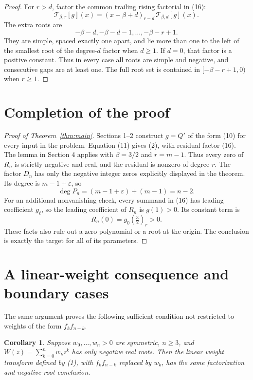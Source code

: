 \documentclass[11pt,a4paper]{article}
\newtheorem{corollary}[theorem]{Corollary}
\begin{document}
\begin{proof}
For $r>d$, factor the common trailing rising factorial in (16):
\[
 \mathcal T_{\beta,r}[g](x)
 =(x+\beta+d)_{r-d}\,\mathcal T_{\beta,d}[g](x). \tag{22}
\]
The extra roots are
\[
 -\beta-d,-\beta-d-1,\ldots,-\beta-r+1.
\]
They are simple, spaced exactly one apart, and lie more than one to the left of the smallest root of the degree-$d$ factor when $d\geq1$. If $d=0$, that factor is a positive constant. Thus in every case all roots are simple and negative, and consecutive gaps are at least one. The full root set is contained in $[-\beta-r+1,0)$ when $r\geq1$. \end{proof}

\section{Completion of the proof}\label{sec:completion}
\begin{proof}[Proof of Theorem~\ref{thm:main}]

Sections 1--2 construct $g=Q'$ of the form (10) for every input in the problem. Equation (11) gives (2), with residual factor (16). The lemma in Section 4 applies with $\beta=3/2$ and $r=m-1$. Thus every zero of $R_n$ is strictly negative and real, and the residual is nonzero of degree $r$. The factor $D_n$ has only the negative integer zeros explicitly displayed in the theorem. Its degree is $m-1+\varepsilon$, so
\[
 \deg P_n=(m-1+\varepsilon)+(m-1)=n-2.
\]
For an additional nonvanishing check, every summand in (16) has leading coefficient $g_\ell$, so the leading coefficient of $R_n$ is $g(1)>0$. Its constant term is
\[
 R_n(0)=g_0(\tfrac32)_r>0.
\]
These facts also rule out a zero polynomial or a root at the origin. The conclusion is exactly the target for all of its parameters. \end{proof}

\section{A linear-weight consequence and boundary cases}

The same argument proves the following sufficient condition not restricted to weights of the form \(f_kf_{n-k}\).

\begin{corollary}
Suppose $w_0,\ldots,w_n>0$ are symmetric, $n\geq3$, and $W(z)=\sum_{k=0}^n w_kz^k$ has only negative real roots. Then the linear weight transform defined by (1), with $f_kf_{n-k}$ replaced by $w_k$, has the same factorization and negative-root conclusion.
\end{corollary}
\end{document}
